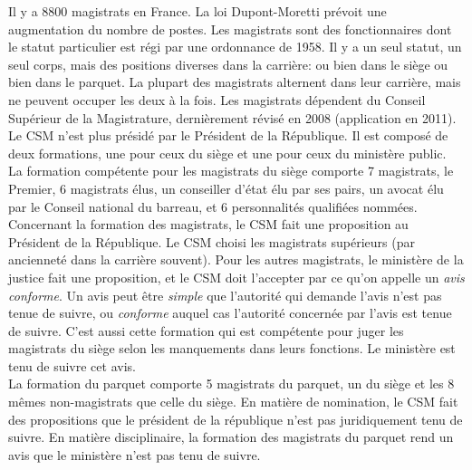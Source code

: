 \documentclass[math]{cours}
\begin{document}
Il y a 8800 magistrats en France. La loi Dupont-Moretti prévoit une augmentation du nombre de postes.
Les magistrats sont des fonctionnaires dont le statut particulier est régi par une ordonnance de 1958.
Il y a un seul statut, un seul corps, mais des positions diverses dans la carrière:
ou bien dans le siège ou bien dans le parquet.
La plupart des magistrats alternent dans leur carrière, mais ne peuvent occuper les deux à la fois.
Les magistrats dépendent du Conseil Supérieur de la Magistrature, dernièrement révisé en 2008 (application en 2011).
Le CSM n'est plus présidé par le Président de la République.
Il est composé de deux formations, une pour ceux du siège et une pour ceux du ministère public.\\

La formation compétente pour les magistrats du siège comporte 7 magistrats, le Premier, 6 magistrats élus, un conseiller d'état élu par ses pairs, un avocat élu par le Conseil national du barreau, et 6 personnalités qualifiées nommées.
Concernant la formation des magistrats, le CSM fait une proposition au Président de la République.
Le CSM choisi les magistrats supérieurs (par ancienneté dans la carrière souvent).
Pour les autres magistrats, le ministère de la justice fait une proposition, et le CSM doit l'accepter par ce qu'on appelle un \emph{avis conforme}.
Un avis peut être \emph{simple} que l'autorité qui demande l'avis n'est pas tenue de suivre, ou \emph{conforme} auquel cas l'autorité concernée par l'avis est tenue de suivre.
C'est aussi cette formation qui est compétente pour juger les magistrats du siège selon les manquements dans leurs fonctions.
Le ministère est tenu de suivre cet avis.\\
La formation du parquet comporte 5 magistrats du parquet, un du siège et les 8 mêmes non-magistrats que celle du siège.
En matière de nomination, le CSM fait des propositions que le président de la république n'est pas juridiquement tenu de suivre.
En matière disciplinaire, la formation des magistrats du parquet rend un avis que le ministère n'est pas tenu de suivre.
\end{document}
